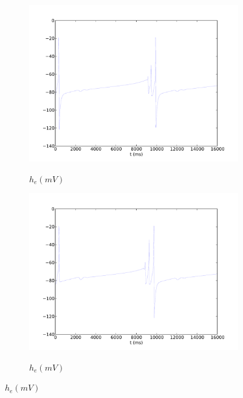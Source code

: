 \documentclass[a4paper,12pt]{article}
\begin{document}
\begin{figure}
\begin{subfigure}[b]{0.5\textwidth}
		\includegraphics[scale=0.35]{chosen-frontiers-2012/00493-0_11-he-intra.pdf}
		\label{fig:493_c}
		\caption{$h_e (mV)$}
	\end{subfigure}
	\begin{subfigure}[b]{0.5\textwidth}
		\includegraphics[scale=0.35]{chosen-frontiers-2012/00493-0_1-he-intra.pdf}
		\label{fig:493_d}
		\caption{$h_e (mV)$}
	\end{subfigure}


\end{figure}
\end{document}
